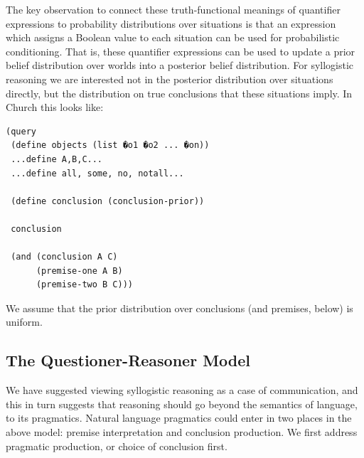\documentclass[10pt,letterpaper]{article}
\begin{document}
The key observation to connect these truth-functional meanings of quantifier expressions to probability distributions over situations is that an expression which assigns a Boolean value to each situation can be used for probabilistic conditioning. That is, these quantifier expressions can be used to update a prior belief distribution over worlds into a posterior belief distribution. For syllogistic reasoning we are interested not in the posterior distribution over situations directly, but the distribution on true conclusions that these situations imply. In Church this looks like:
\begin{lstlisting}
(query
 (define objects (list �o1 �o2 ... �on)) 
 ...define A,B,C...
 ...define all, some, no, notall...
 
 (define conclusion (conclusion-prior))
 
 conclusion
 
 (and (conclusion A C) 
      (premise-one A B)
      (premise-two B C)))
\end{lstlisting}
We assume that the prior distribution over conclusions (and premises, below) is uniform.

%
%  
%  


\subsection{The Questioner-Reasoner Model}
We have suggested viewing syllogistic reasoning as a case of communication, and this in turn suggests that reasoning should go beyond the semantics of language, to its pragmatics.
Natural language pragmatics could enter in two places in the above model: premise interpretation and conclusion production. 
We first address pragmatic production, or choice of conclusion first.
\end{document}
